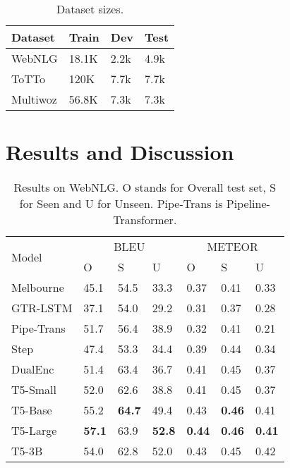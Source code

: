 \documentclass[11pt,a4paper]{article}
\begin{document}
\begin{table}[h]
\centering
\begin{tabular}{l|l|l|l}  \hline
Dataset  & Train  & Dev  & Test \\ \hline
WebNLG   & 18.1K  & 2.2k & 4.9k \\
ToTTo    & 120K & 7.7k & 7.7k \\
Multiwoz & 56.8K  & 7.3k & 7.3k  \\ \hline
\end{tabular}
\caption{Dataset sizes.}
\label{dataset-stats}
\end{table}



\section{Results and Discussion} 



\begin{table}[]
\centering
\begin{adjustbox}{width=\columnwidth,center}
\begin{tabular}{llll||lll} \hline
\multirow{2}{*}{Model} & \multicolumn{3}{c}{BLEU} & \multicolumn{3}{c}{METEOR}                            \\ 
                       & O  & S & U & O                  & S                     & U                   \\ \hline
 Melbourne              & 45.1     & 54.5 & 33.3   & 0.37                     & 0.41                     & 0.33                     \\
 GTR-LSTM              & 37.1     & 54.0 & 29.2   & 0.31                     & 0.37                     & 0.28                     \\ \hline
Pipe-Trans            & 51.7     & 56.4 & 38.9   & 0.32                     & 0.41                     & 0.21                     \\
Step           & 47.4     & 53.3 & 34.4   & 0.39                     & 0.44                     & 0.34                     \\
DualEnc                & 51.4     & 63.4 & 36.7   & 0.41                     & 0.45                     & 0.37                     \\ \hline
 T5-Small               & 52.0     & 62.6 & 38.8   & 0.41 & 0.45 & 0.37 \\
 T5-Base                & 55.2     & \textbf{64.7} & 49.4   & 0.43 & \textbf{0.46} & 0.41 \\
T5-Large               & \textbf{57.1}     & 63.9 & \textbf{52.8}   & \textbf{0.44} & \textbf{0.46} & \textbf{0.41} \\ 
 T5-3B                  & 54.0     & 62.8 & 52.0   & 0.43 & 0.45 & 0.42 \\ \hline
\end{tabular}
\end{adjustbox}
\caption{Results on WebNLG. O stands for Overall test set, S for Seen and U for Unseen. Pipe-Trans is Pipeline-Transformer.}
\label{results-webnlg}
\end{table}
\end{document}
